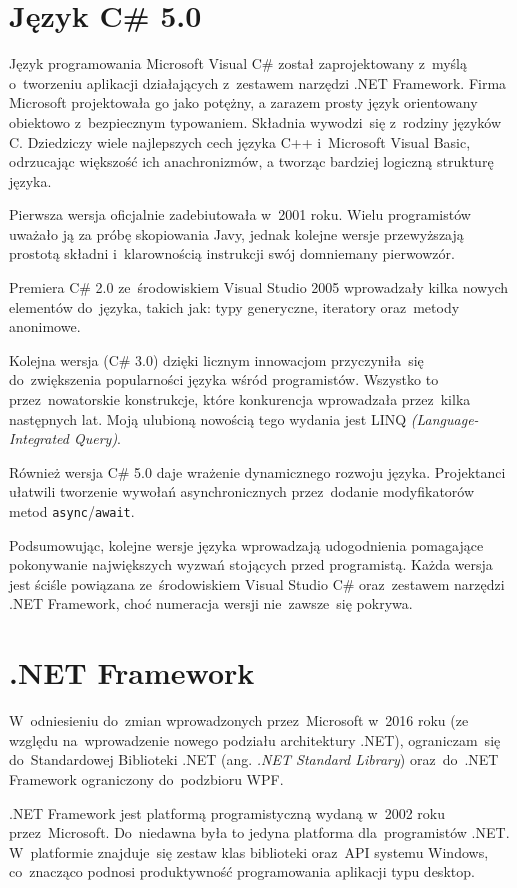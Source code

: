 \documentclass[a4paper,twoside,titlepage,openright]{book}
\begin{document}
\section{Język C\# 5.0}
Język programowania Microsoft Visual C\# został zaprojektowany z~myślą o~tworzeniu aplikacji działających z~zestawem narzędzi .NET Framework. Firma Microsoft projektowała go jako potężny, a zarazem prosty język orientowany obiektowo z~bezpiecznym typowaniem.\cite{csharp} Składnia wywodzi~się z~rodziny języków C. Dziedziczy wiele najlepszych cech języka C++ i~Microsoft Visual Basic, odrzucając większość ich anachronizmów, a tworząc bardziej logiczną strukturę języka. 

Pierwsza wersja oficjalnie zadebiutowała w~2001 roku. Wielu programistów uważało ją za próbę skopiowania Javy, jednak kolejne wersje przewyższają prostotą składni i~klarownością instrukcji swój domniemany pierwowzór. 

Premiera C\# 2.0 ze~środowiskiem Visual Studio 2005 wprowadzały kilka nowych elementów do~języka, takich jak: typy generyczne, iteratory oraz~metody anonimowe. 

Kolejna wersja (C\# 3.0) dzięki licznym innowacjom przyczyniła~się do~zwiększenia popularności języka wśród programistów. Wszystko to przez~nowatorskie konstrukcje, które konkurencja wprowadzała przez~kilka następnych lat. Moją ulubioną nowością tego wydania jest LINQ \textit{(Language-Integrated Query)}. 

Również wersja C\# 5.0 daje wrażenie dynamicznego rozwoju języka. Projektanci ułatwili tworzenie wywołań asynchronicznych przez~dodanie modyfikatorów metod \texttt{async}/\texttt{await}. 

Podsumowując, kolejne wersje języka wprowadzają udogodnienia pomagające pokonywanie największych wyzwań stojących przed programistą. Każda wersja jest ściśle powiązana ze~środowiskiem Visual Studio C\# oraz~zestawem narzędzi .NET Framework, choć numeracja wersji nie~zawsze~się pokrywa.

\section{.NET Framework}
W~odniesieniu do~zmian wprowadzonych przez~Microsoft w~2016 roku (ze względu na~wprowadzenie nowego podziału architektury .NET), ograniczam~się do~Standardowej Biblioteki .NET (ang. \textit{.NET Standard Library}) oraz~do~.NET Framework ograniczony do~podzbioru WPF.\cite{dotnetArtykul} 

.NET Framework jest platformą programistyczną wydaną w~2002 roku przez~Microsoft. Do~niedawna była to jedyna platforma dla~programistów .NET.\cite{dotnetArtykul}  W~platformie znajduje~się zestaw klas biblioteki oraz~API systemu Windows, co~znacząco podnosi produktywność programowania aplikacji typu desktop. 
\end{document}
